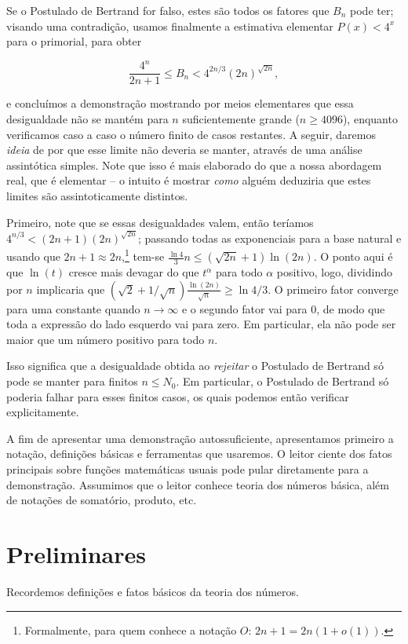 \documentclass[11pt]{article}
\theoremstyle{remark}
\newcommand{\vs}{\vspace{10px}}
\begin{document}
Se o Postulado de Bertrand for falso, estes são todos os fatores que $B_n$ pode ter; visando uma contradição, usamos finalmente a estimativa elementar $P(x)< 4^x$ para o primorial, para obter

\[\frac{4^n}{2n+1}\le B_n<4^{2n/3}(2n)^{\sqrt{2n}},\]

e concluímos a demonstração mostrando por meios elementares que essa desigualdade não se mantém para $n$ suficientemente grande ($n\ge 4096$), enquanto verificamos caso a caso o número finito de casos restantes. A seguir, daremos \textit{ideia} de por que esse limite não deveria se manter, através de uma análise assintótica simples. Note que isso é mais elaborado do que a nossa abordagem real, que é elementar -- o intuito é mostrar \textit{como} alguém deduziria que estes limites são assintoticamente distintos.
\vs

Primeiro, note que se essas desigualdades valem, então teríamos $4^{n/3}< (2n+1)(2n)^{\sqrt{2n}}$; passando todas as exponenciais para a base natural e usando que $2n+1 \approx 2n$,\footnote{Formalmente, para quem conhece a notação $O$: $2n+1=2n(1+o(1))$.} tem-se $\frac{\ln4}{3}n\le (\sqrt{2n}+1)\ln(2n)$. O ponto aqui é que $\ln(t)$ cresce mais devagar do que $t^\alpha$ para todo $\alpha$ positivo, logo, dividindo por $n$ implicaria que $(\sqrt{2}+1/\sqrt{n})\frac{\ln(2n)}{\sqrt{n}}\ge \ln4/3$. O primeiro fator converge para uma constante quando $n\to \infty$ e o segundo fator vai para $0$, de modo que toda a expressão do lado esquerdo vai para zero. Em particular, ela não pode ser maior que um número positivo para todo $n$.

Isso significa que a desigualdade obtida ao \textit{rejeitar} o Postulado de Bertrand só pode se manter para finitos $n\le N_0$. Em particular, o Postulado de Bertrand só poderia falhar para esses finitos casos, os quais podemos então verificar explicitamente.
\vs

A fim de apresentar uma demonstração autossuficiente, apresentamos primeiro a notação, definições básicas e ferramentas que usaremos. O leitor ciente dos fatos principais sobre funções matemáticas usuais pode pular diretamente para a demonstração. Assumimos que o leitor conhece teoria dos números básica, além de notações de somatório, produto, etc.

\section{Preliminares}
Recordemos definições e fatos básicos da teoria dos números.
\end{document}
